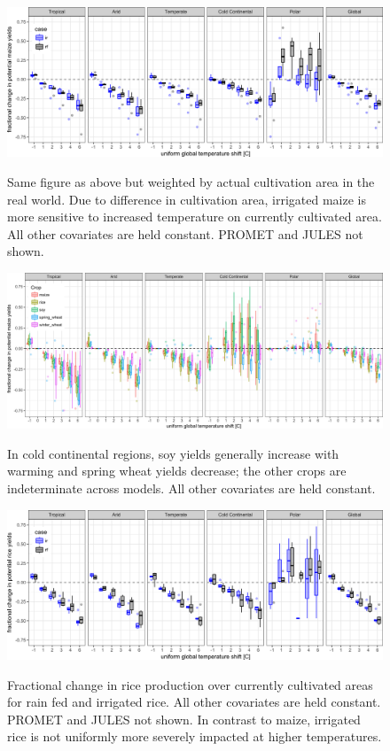 \documentclass[10pt]{article}
\begin{document}
\begin{figure}[h!]
\includegraphics[width=\textwidth]{s_maize_sim_CG_area_weight.png}\\
\caption{Same figure as above but weighted by actual cultivation area in the real world. Due to difference in cultivation area, irrigated maize is more sensitive to increased temperature on currently cultivated area. All other covariates are held constant. PROMET and JULES not shown.}
\label{fig:KGirr_currentcult}
\end{figure}

\begin{figure}[h!]
\includegraphics[width=\textwidth]{s_sim_KG_crops_all.png}\\
\caption{In cold continental regions, soy yields generally increase with warming and spring wheat yields decrease; the other crops are indeterminate across models. All other covariates are held constant.}
\label{fig:KGcrops_all}
\end{figure}

\begin{figure}[h!]
\includegraphics[width=\textwidth]{s_rice_sim_CG_area_weight.png}\\
\caption{Fractional change in rice production over currently cultivated areas for rain fed and irrigated rice. All other covariates are held constant. PROMET and JULES not shown. In contrast to maize, irrigated rice is not uniformly more severely impacted at higher temperatures.}
\label{fig:rice_currentcult}
\end{figure}
\end{document}
